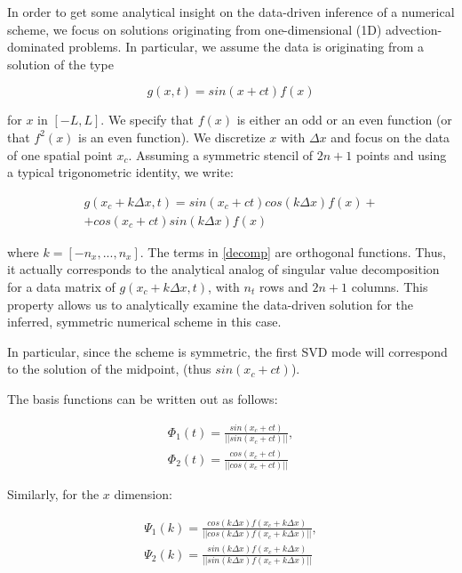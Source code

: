 \documentclass[%
  twocolumn
]{mpi2015-cscpreprint}
\begin{document}
In order to get some analytical insight on the data-driven inference of a numerical scheme, we focus on solutions originating from one-dimensional (1D) advection-dominated problems. In particular, we assume the data is originating from a solution of the type

\begin{equation}
\label{refeq}
g(x,t)=sin(x+ct) f(x)
\end{equation}

for $x$ in $[-L,L]$. We specify that $f(x)$ is either an odd or an even function (or that $f^2(x)$ is an even function). We discretize $x$ with $\Delta x$ and focus on the data of one spatial point $x_c$. Assuming a symmetric stencil of $2n+1$ points and using a typical trigonometric identity, we write:

\begin{multline}
\label{decomp}
g(x_c+k\Delta x,t)=sin(x_c+ct)cos(k\Delta x) f(x)+\\
+cos(x_c+ct)sin(k\Delta x) f(x)
\end{multline}

where $k=[-n_x,...,n_x]$. The terms in \ref{decomp} are orthogonal functions. Thus, it actually corresponds to the analytical analog of singular value decomposition for a data matrix of $g(x_c+k\Delta x,t)$, with $n_t$ rows and $2n+1$ columns. This property allows us to analytically examine the data-driven solution for the inferred, symmetric numerical scheme in this case.

In particular, since the scheme is symmetric, the first SVD mode will correspond to the solution of the midpoint, (thus $sin(x_c+ct)$). 

The basis functions can be written out as follows:


\begin{align}
\Phi_1(t)=\frac{sin(x_c+ct)}{|| sin(x_c+ct) || } ,\\
\Phi_2(t)=\frac{cos(x_c+ct)}{|| cos(x_c+ct) || } 
\end{align}

Similarly, for the $x$ dimension:


\begin{align}
\Psi_1(k)=\frac{cos(k \Delta x) f(x_c+k \Delta x)}{|| cos(k \Delta x) f(x_c+k \Delta x) || } ,\\
\Psi_2(k)=\frac{sin(k \Delta x) f(x_c+k \Delta x)}{|| sin(k \Delta x) f(x_c+k \Delta x) || }
\end{align}
\end{document}
